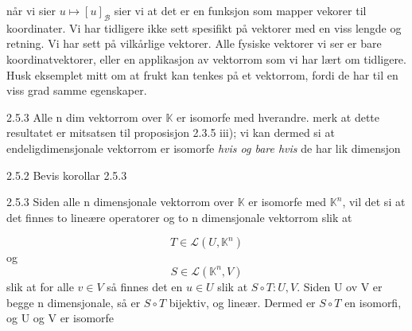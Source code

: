 \documentclass[a4paper,norsk]{article}
\begin{document}
når vi sier $ u \mapsto \left[ u \right] _{\mathcal{B}} $ sier vi at det er en funksjon som mapper vekorer til koordinater. Vi har tidligere ikke sett spesifikt på vektorer med en viss lengde og retning. Vi har sett på vilkårlige vektorer. Alle fysiske vektorer vi ser er bare koordinatvektorer, eller en applikasjon av vektorrom som vi har lært om tidligere. Husk eksemplet mitt om at frukt kan tenkes på et vektorrom, fordi de har til en viss grad samme egenskaper.

\begin{corollarybox}{2.5.3}{}
Alle n dim vektorrom over $ \mathbb{K} $ er isomorfe med hverandre. merk at dette resultatet er mitsatsen til proposisjon 2.3.5 iii); vi kan dermed si at endeligdimensjonale vektorrom er isomorfe \textit{hvis og bare hvis} de har lik dimensjon
\end{corollarybox}
\begin{oppgavebox}{2.5.2}{}
Bevis korollar 2.5.3

\begin{proofbox}{2.5.3}{}
Siden alle n dimensjonale vektorrom over $ \mathbb{K} $ er isomorfe med $ \mathbb{K}^n $, vil det si at det finnes to lineære operatorer og to n dimensjonale vektorrom slik at 

\[
    T \in \mathcal{L} \left( U, \mathbb{K}^n \right) 
\]
og \[
    S \in \mathcal{L} \left( \mathbb{K}^n, V \right) 
\]
slik at for alle $ v \in V $ så finnes det en $ u \in U $ slik at $ S \circ T : U, V $. Siden U ov V er begge n dimensjonale, så er $ S \circ T $ bijektiv, og lineær. Dermed er $ S \circ T $ en isomorfi, og U og V er isomorfe
\end{proofbox}
\end{oppgavebox}
\end{document}
